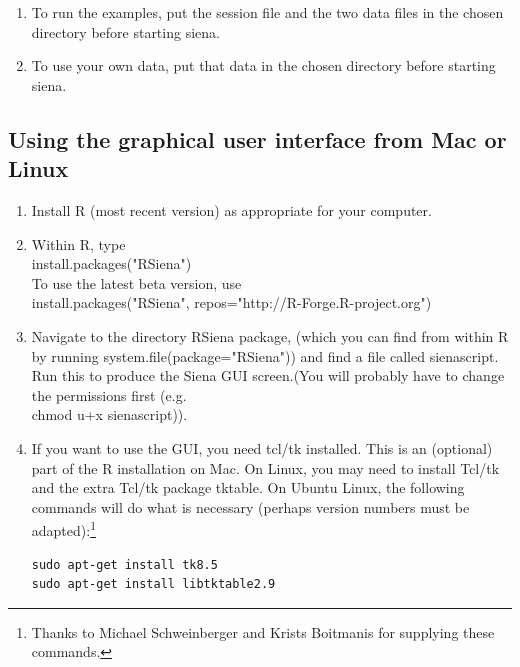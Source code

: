 \documentclass[a4paper,fleqn]{article}
\newcommand{\+}{\, + \,}
\newcommand{\sfn}[1]{\textsf{#1}}
\newcommand{\R}{{\sf R }}
\newcommand{\Rn}{{\sf R}}
\begin{document}
\begin{enumerate}
\begin{enumerate}
\item To run the examples, put the session file and the two data files in
the chosen directory before starting siena.

\item To use your own data, put that data in the chosen directory before
starting siena.
\end{enumerate}
\end{enumerate}

\subsection{Using the graphical user interface from Mac or Linux}
\begin{enumerate}
\item Install \R (most recent version) as appropriate for your computer.
\item Within \Rn, type\\
  \sfn{install.packages("RSiena")}\\
To use the latest beta version, use\\
 \sfn{install.packages("RSiena", repos="http://R-Forge.R-project.org")}



\item Navigate to the directory RSiena package, (which you can find from within
  R by running \sfn{system.file(package="RSiena")}) and find a file called
  \sfn{sienascript}.  Run this to produce the Siena GUI screen.(You will
  probably have to change the permissions first (e.g.\ \\ \textsf{chmod u+x
    sienascript})).
\item If you want to use the GUI, you need tcl/tk installed. This is an
  (optional) part of the R installation on Mac. On Linux, you may need to
  install Tcl/tk and the extra Tcl/tk package \sfn{tktable}. On
  Ubuntu Linux, the following commands will do what is
  necessary (perhaps version numbers must be adapted):\protect\footnote{Thanks
  to Michael Schweinberger and Krists Boitmanis for supplying these commands.}
\begin{verbatim}
sudo apt-get install tk8.5
sudo apt-get install libtktable2.9
\end{verbatim}
\end{enumerate}
\end{document}

